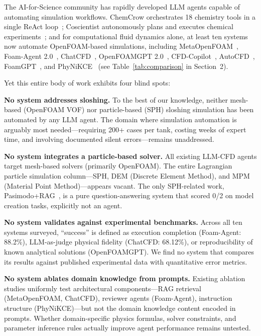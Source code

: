 \documentclass[11pt]{article}
\begin{document}
The AI-for-Science community has rapidly developed LLM agents capable of automating simulation workflows. ChemCrow orchestrates 18 chemistry tools in a single ReAct loop~\citep{bran2024chemcrow}; Coscientist autonomously plans and executes chemical experiments~\citep{boiko2023coscientist}; and for computational fluid dynamics alone, at least ten systems now automate OpenFOAM-based simulations, including MetaOpenFOAM~\citep{metaopenfoam2024}, Foam-Agent 2.0~\citep{foamagent2025}, ChatCFD~\citep{chatcfd2026}, OpenFOAMGPT 2.0~\citep{openfoamgpt2025}, CFD-Copilot~\citep{cfdcopilot2025}, AutoCFD~\citep{autocfd2025}, FoamGPT~\citep{foamgpt2025}, and PhyNiKCE~\citep{phynikce2026} (see Table~\ref{tab:comparison} in Section~2).

Yet this entire body of work exhibits four blind spots:

\textbf{No system addresses sloshing.} To the best of our knowledge, neither mesh-based (OpenFOAM VOF) nor particle-based (SPH) sloshing simulation has been automated by any LLM agent. The domain where simulation automation is arguably most needed---requiring 200+ cases per tank, costing weeks of expert time, and involving documented silent errors---remains unaddressed.

\textbf{No system integrates a particle-based solver.} All existing LLM-CFD agents target mesh-based solvers (primarily OpenFOAM). The entire Lagrangian particle simulation column---SPH, DEM (Discrete Element Method), and MPM (Material Point Method)---appears vacant. The only SPH-related work, Pasimodo+RAG~\citep{pasimodo2025}, is a pure question-answering system that scored 0/2 on model creation tasks, explicitly not an agent.

\textbf{No system validates against experimental benchmarks.} Across all ten systems surveyed, ``success'' is defined as execution completion (Foam-Agent: 88.2\%), LLM-as-judge physical fidelity (ChatCFD: 68.12\%), or reproducibility of known analytical solutions (OpenFOAMGPT). We find no system that compares its results against published experimental data with quantitative error metrics.

\textbf{No system ablates domain knowledge from prompts.} Existing ablation studies uniformly test architectural components---RAG retrieval (MetaOpenFOAM, ChatCFD), reviewer agents (Foam-Agent), instruction structure (PhyNiKCE)---but not the domain knowledge content encoded in prompts. Whether domain-specific physics formulas, solver constraints, and parameter inference rules actually improve agent performance remains untested.
\end{document}
